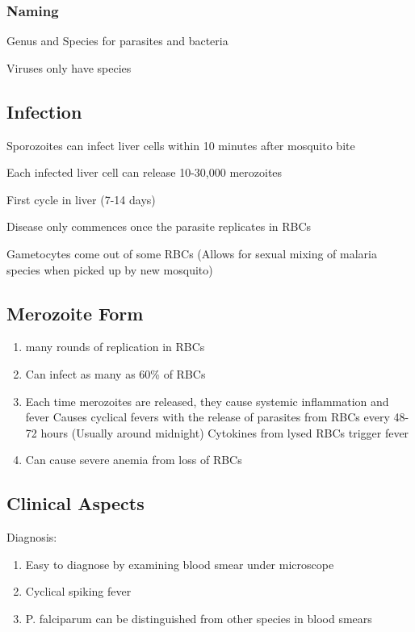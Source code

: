 \documentclass{notes}
\begin{document}
\subsubsection*{Naming}
Genus and Species for parasites and bacteria

Viruses only have species

\subsection*{Infection}
Sporozoites can infect liver cells within 10 minutes after mosquito bite

Each infected liver cell can release 10-30,000 merozoites

First cycle in liver (7-14 days)

Disease only commences once the parasite replicates in RBCs

Gametocytes come out of some RBCs (Allows for sexual mixing of malaria species when picked up by new mosquito)

\subsection*{Merozoite Form}
\begin{enumerate}
    \item many rounds of replication in RBCs
    \item Can infect as many as 60\% of RBCs
    \item Each time merozoites are released, they cause systemic inflammation and fever
    \subitem Causes cyclical fevers with the release of parasites from RBCs every 48-72 hours (Usually around midnight)
    \subsubitem Cytokines from lysed RBCs trigger fever
    \item Can cause severe anemia from loss of RBCs
\end{enumerate}

\subsection*{Clinical Aspects}
Diagnosis:
\begin{enumerate}
    \item Easy to diagnose by examining blood smear under microscope
    \item Cyclical spiking fever
    \item P. falciparum can be distinguished from other species in blood smears
\end{enumerate}
\end{document}
